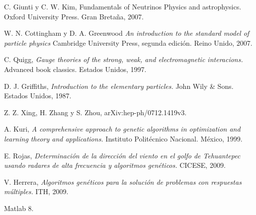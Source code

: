  C. Giunti y C. W. Kim,
Fundamentals of Neutrinos Physics and astrophysics. Oxford University Press.
Gran Breta\~na, 2007.

 W. N. Cottingham y D. A.
Greenwood {\em An introduction to the standard model of particle physics}
Cambridge University Press, segunda edici\'on. Reino Unido, 2007.

 C. Quigg, {\em Gauge theories of the strong,
weak, and electromagnetic interacions.} Advanced book classics. Estados Unidos,
1997.

 D. J. Griffiths, {\em Introduction to the
elementary particles.} John Wily \& Sons. Estados Unidos, 1987.

 Z. Z. Xing, H. Zhang y S. Zhou, 
arXiv:hep-ph/0712.1419v3.

 A. Kuri, {\em A comprehensive approach to
genetic algorithms in optimization and learning theory and applications.} 
Instituto Polit\'ecnico Nacional. M\'exico, 1999.

 E. Rojas, {\em Determinaci\'on de la direcci\'on del viento en
el golfo de Tehuantepec usando radares de alta frecuencia y algoritmos
gen\'eticos.} CICESE, 2009.

 V. Herrera, {\em Algoritmos gen\'eticos para la soluci\'on de
problemas con respuestas m\'ultiples.} ITH, 2009.

 Matlab 8.

